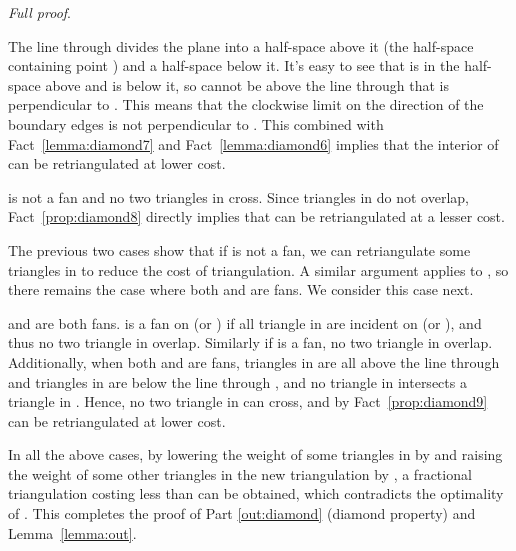 \documentclass[final]{siamltex}
\newcommand{\Picture}[1]{}
\newcommand{\xfigpdf}[1]{\Picture{#1.pdf_t}}
\newcommand{\xfig}[1]{\xfigpdf{#1}}
\newenvironment{fullproof}{\par{\it Full proof}. \ignorespaces}{\endproof}
\begin{document}
\begin{fullproof}
\begin{center}
\scalebox{.5}
{
  \xfig{case2large}
}
\end{center}
The line through  divides the plane into a half-space above it (the half-space containing point ) and 
a half-space below it. It's easy to see that  is in the half-space above  and  is below it, 
so  cannot be above the line through  that is perpendicular to . This means that the clockwise 
limit on the direction of the boundary edges is not perpendicular to . 
This combined with Fact~\ref{lemma:diamond7} and Fact~\ref{lemma:diamond6} implies that the interior of  can 
be retriangulated at lower cost.



  is not a fan and no two triangles in  cross. 
Since triangles in  do not overlap, Fact~\ref{prop:diamond8} directly implies that  can be retriangulated at a lesser cost.

The previous two cases show that if  is not a fan, we can retriangulate some triangles in  to reduce the cost of triangulation.
A similar argument applies to , so there remains the case where both  and  are fans. We consider this case next.



  and  are both fans. 
 is a fan on  (or ) if all triangle in   are incident on  (or ), and 
thus no two triangle in  overlap. Similarly if  is a fan, no two triangle in 
overlap. Additionally, when both  and  are fans, triangles in  are all above the
line through  and triangles in  are below the line through , and no triangle in 
intersects a triangle in . Hence, no two triangle in  can cross, and 
by Fact~\ref{prop:diamond9}  can be retriangulated at lower cost.


In all the above cases,
by lowering the weight of some triangles in  by 
and raising the weight of some other triangles in the new triangulation by , 
a fractional triangulation costing less than  can be obtained, which contradicts the optimality of .
This completes the proof of Part \ref{out:diamond} (diamond property) and Lemma~\ref{lemma:out}. 
\end{fullproof}
\end{document}
